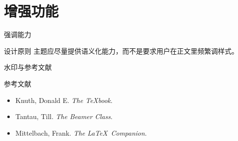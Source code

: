 \section{增强功能}

\begin{frame}{强调能力}
  \begin{alertblock}{设计原则}
    主题应尽量提供语义化能力，而不是要求用户在正文里频繁调样式。
  \end{alertblock}
\end{frame}

\begin{frame}{水印与参考文献}
  \begin{block}{参考文献}
    \begin{itemize}
      \item Knuth, Donald E. \textit{The \TeX book}.
      \item Tantau, Till. \textit{The Beamer Class}.
      \item Mittelbach, Frank. \textit{The \LaTeX\ Companion}.
    \end{itemize}
  \end{block}
\end{frame}
